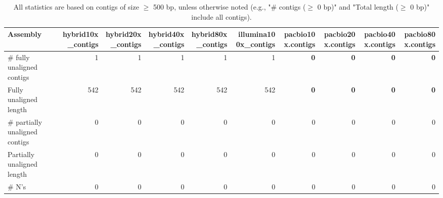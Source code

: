 \documentclass[12pt,a4paper]{article}
\begin{document}
\begin{table}[ht]
\begin{center}
\caption{All statistics are based on contigs of size $\geq$ 500 bp, unless otherwise noted (e.g., "\# contigs ($\geq$ 0 bp)" and "Total length ($\geq$ 0 bp)" include all contigs).}
\begin{tabular}{|l*{9}{|r}|}
\hline
Assembly & hybrid10x\_contigs & hybrid20x\_contigs & hybrid40x\_contigs & hybrid80x\_contigs & illumina100x\_contigs & pacbio10x.contigs & pacbio20x.contigs & pacbio40x.contigs & pacbio80x.contigs \\ \hline
\# fully unaligned contigs & 1 & 1 & 1 & 1 & 1 & {\bf 0} & {\bf 0} & {\bf 0} & {\bf 0} \\ \hline
Fully unaligned length & 542 & 542 & 542 & 542 & 542 & {\bf 0} & {\bf 0} & {\bf 0} & {\bf 0} \\ \hline
\# partially unaligned contigs & 0 & 0 & 0 & 0 & 0 & 0 & 0 & 0 & 0 \\ \hline
Partially unaligned length & 0 & 0 & 0 & 0 & 0 & 0 & 0 & 0 & 0 \\ \hline
\# N's & 0 & 0 & 0 & 0 & 0 & 0 & 0 & 0 & 0 \\ \hline
\end{tabular}
\end{center}
\end{table}
\end{document}
